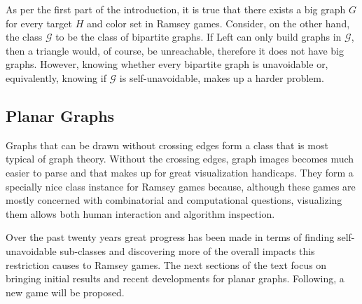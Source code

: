 As per the first part of the introduction, it is true that there exists a big graph $G$ for every target $H$ and color set  in Ramsey games. Consider, on the other hand, the class $\mathcal{G}$ to be the class of bipartite graphs. If Left can only build graphs in $\mathcal{G}$, then a triangle would, of course, be unreachable, therefore it does not have big graphs. However, knowing whether every bipartite graph is unavoidable or, equivalently, knowing if $\mathcal{G}$ is self-unavoidable, makes up a harder problem.

\subsection*{Planar Graphs}

Graphs that can be drawn without crossing edges form a class that is most typical of graph theory. Without the crossing edges, graph images becomes much easier to parse and that makes up for great visualization handicaps. They form a specially nice class instance for Ramsey games because, although these games are mostly concerned with combinatorial and computational questions, visualizing them allows both human interaction and algorithm inspection.

Over the past twenty years great progress has been made in terms of finding self-unavoidable sub-classes and discovering more of the overall impacts this restriction causes to Ramsey games. The next sections of the text focus on bringing initial results and recent developments for planar graphs. Following, a new game will be proposed.













